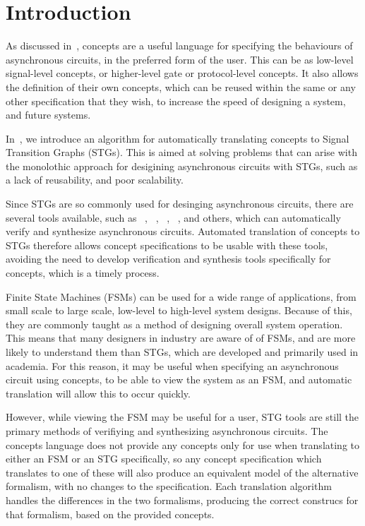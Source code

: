 
\section{Introduction \label{sec:intro}}

As discussed in~\cite{2015_Beaumont_MEMOCODE}, concepts are a useful language
for specifying the behaviours of asynchronous circuits,
in the preferred form of the user. This can be as
low-level signal-level concepts, or higher-level gate or
protocol-level concepts. It also allows the definition
of their own concepts, which can be reused within
the same or any other specification that they wish, to
increase the speed of designing a system, and future
systems.

In~\cite{2016_concept_STG_translation}, we introduce an 
algorithm for automatically translating concepts to Signal Transition Graphs (STGs). 
This is aimed at solving problems that can arise with the monolothic approach
for desigining asynchronous circuits with STGs, such as a lack of reusability, and 
poor scalability. 

Since STGs are so commonly used for desinging asynchronous circuits,
there are several tools available, such as ~\cite{Cortadella}, ~\cite{khomenko2004detecting}, ~\cite{i1997formal},
~\cite{Sokolov-2016-book-Workcraft}\cite{Workcraft_website}, and others, which can automatically verify and synthesize
asynchronous circuits. Automated translation of concepts to STGs therefore allows concept specifications
to be usable with these tools, avoiding the need to develop verification and synthesis tools specifically for 
concepts, which is a timely process. 

Finite State Machines (FSMs) can be used for a wide range of applications, from small scale
to large scale, low-level to high-level system designs. Because of this, they are commonly taught
as a method of designing overall system operation. This means that many designers in industry
are aware of of FSMs, and are more likely to understand them than STGs, which are developed
and primarily used in academia. For this reason, it may be useful when specifying an asynchronous circuit 
using concepts, to be able to view the system as an FSM, and automatic translation will allow this to occur quickly.

However, while viewing the FSM may be useful for a user, STG tools are still the primary methods of 
verifiying and synthesizing asynchronous circuits. The concepts language does not provide any
concepts only for use when translating to either an FSM or an STG specifically, so any concept specification
which translates to one of these will also produce an equivalent model of the alternative formalism, with
no changes to the specification. Each translation algorithm handles the differences in the two formalisms,
producing the correct construcs for that formalism, based on the provided concepts. 

